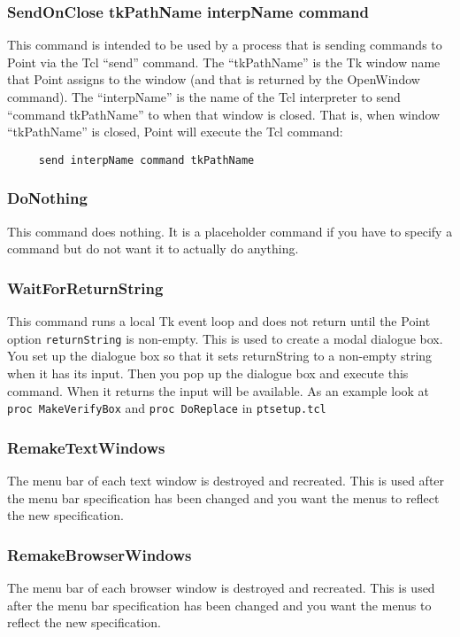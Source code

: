 \subsubsection{SendOnClose tkPathName interpName command}
This command is intended to be used by a process that
is sending commands to Point via the Tcl ``send'' command.
The ``tkPathName'' is the Tk window name that Point
assigns to the window (and that is returned by the
OpenWindow command).
The ``interpName'' is the name of the Tcl interpreter to send
``command tkPathName'' to when that window is closed.
That is, when window ``tkPathName'' is closed,
Point will execute the Tcl command:
\begin{verbatim}
     send interpName command tkPathName
\end{verbatim}

\subsubsection{DoNothing}
This command does nothing.
It is a placeholder command if you have to specify
a command but do not want it to actually do anything.

\subsubsection{WaitForReturnString}
This command runs a local Tk event loop and does not return
until the Point option {\tt returnString} is non-empty.
This is used to create a modal dialogue box.
You set up the dialogue box so that it sets returnString to
a non-empty string when it has its input.
Then you pop up the dialogue box and execute this command.
When it returns the input will be available.
As an example look at {\tt proc MakeVerifyBox} and
{\tt proc DoReplace} in {\tt ptsetup.tcl}

\subsubsection{RemakeTextWindows}
The menu bar of each text window is destroyed and recreated.
This is used after the menu bar specification has been changed
and you want the menus to reflect the new specification.

\subsubsection{RemakeBrowserWindows}
The menu bar of each browser window is destroyed and recreated.
This is used after the menu bar specification has been changed
and you want the menus to reflect the new specification.

